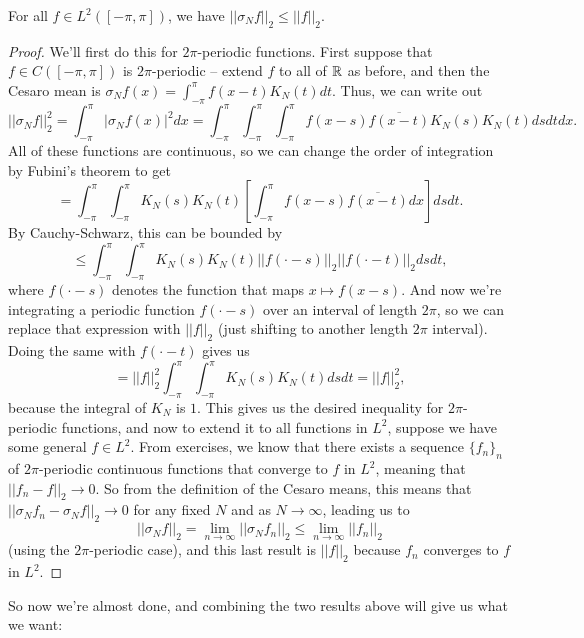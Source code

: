\begin{proposition}\label{cesaroineq}
For all $f \in L^2([-\pi, \pi])$, we have $||\sigma_N f||_2 \le ||f||_2$.
\end{proposition}
\begin{proof}
We'll first do this for $2\pi$-periodic functions. First suppose that $f \in C([-\pi, \pi])$ is $2\pi$-periodic -- extend $f$ to all of $\mathbb R$ as before, and then the Cesaro mean is $\sigma_Nf(x) = \int_{-\pi}^{\pi} f(x-t) K_N(t) dt$. Thus, we can write out
\[
    \boxed{||\sigma_Nf||_2^2} = \int_{-\pi}^{\pi} |\sigma_Nf(x)|^2 dx = \int_{-\pi}^\pi \int_{-\pi}^\pi \int_{-\pi}^\pi f(x-s) \overline{f(x-t)} K_N(s) K_N(t) ds dt dx.
\]
All of these functions are continuous, so we can change the order of integration by Fubini's theorem to get 
\[
    = \int_{-\pi}^\pi \int_{-\pi}^\pi K_N(s) K_N(t) \left[\int_{-\pi}^{\pi} f(x-s) \overline{f(x-t)} dx\right] ds dt.
\]
By Cauchy-Schwarz, this can be bounded by 
\[
    \le \int_{-\pi}^\pi \int_{-\pi}^\pi K_N(s) K_N(t) ||f(\cdot -s)||_2 ||f(\cdot-t)||_2 ds dt,
\]
where $f(\cdot-s)$ denotes the function that maps $x \mapsto f(x-s)$. And now we're integrating a periodic function $f(\cdot -s)$ over an interval of length $2\pi$, so we can replace that expression with $||f||_2$ (just shifting to another length $2\pi$ interval). Doing the same with $f(\cdot -t)$ gives us
\[
    = ||f||_2^2\int_{-\pi}^\pi \int_{-\pi}^\pi K_N(s) K_N(t)  ds dt = \boxed{||f||_2^2},
\]
because the integral of $K_N$ is $1$. This gives us the desired inequality for $2\pi$-periodic functions, and now to extend it to all functions in $L^2$, suppose we have some general $f \in L^2$. From exercises, we know that there exists a sequence $\{f_n\}_n$ of $2\pi$-periodic continuous functions that converge to $f$ in $L^2$, meaning that $||f_n - f||_2 \to 0$. So from the definition of the Cesaro means, this means that $||\sigma_N f_n - \sigma_N f||_2 \to 0$ for any fixed $N$ and as $N \to \infty$, leading us to 
\[
    ||\sigma_N f||_2 = \lim_{n \to \infty} ||\sigma_N f_n||_2 \le \lim_{n \to \infty} ||f_n||_2
\]
(using the $2\pi$-periodic case), and this last result is $||f||_2$ because $f_n$ converges to $f$ in $L^2$.
\end{proof}

So now we're almost done, and combining the two results above will give us what we want:

